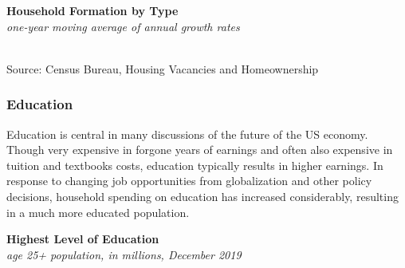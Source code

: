 \documentclass{report}
\makeatletter
\newcommand{\tbllink}[1]{\href{https://raw.githubusercontent.com/bdecon/US-chartbook/master/chartbook/data/#1}{\faTable}}
\newcommand*\short[1]{\expandafter\@gobbletwo\number\numexpr#1\relax}
\newcommand{\sbar}[4]{
		\addplot[ybar stacked, bar width=2.7pt, draw opacity=0, fill=#1] 
			table [x=#2, y=#3, col sep=comma]{#4};}
\newcommand{\stdnode}[3]{\node[below, align=left, shift=({#1,#2})]{#3};}
\newcommand{\dateaxisticks}{
		date coordinates in=x, axis line style={draw=none},
		xmax={2020-02-01},
		max space between ticks=40,	    
		xtick={{1990-01-01}, {1992-01-01}, {1994-01-01}, 
			{1996-01-01}, {1998-01-01}, {2000-01-01}, 
			{2002-01-01}, {2004-01-01}, {2006-01-01},
			{2008-01-01}, {2010-01-01}, {2012-01-01}, {2014-01-01},
		    {2016-01-01}, {2018-01-01}, {2020-01-01}},
		minor xtick={{1989-01-01}, {1991-01-01}, {1993-01-01},
			{1995-01-01}, {1997-01-01}, {1999-01-01}, 
			{2001-01-01}, {2003-01-01}, {2005-01-01}, {2007-01-01},
		    {2009-01-01}, {2011-01-01}, {2013-01-01}, {2015-01-01},
		    {2017-01-01}, {2019-01-01}},
		enlarge y limits={0.06}, enlarge x limits={0.01},
		}
\newcommand{\bbar}[2]{extra #1 ticks = {{#2}}, extra #1 tick labels = ,
		extra #1 tick style = {grid=major, grid style={thick, black!25}},}
\newcommand{\stdline}[4]{\addplot[very thick, no markers, color=#1] 
		table [x=#2, y=#3, col sep=comma] {#4};	}
\newcommand{\rbars}{
		\fill[color=black!10] (axis cs:{1990-07-01},\pgfkeysvalueof{/pgfplots/ymin}) rectangle 
			(axis cs:{1991-03-01}, \pgfkeysvalueof{/pgfplots/ymax});
		\fill[color=black!10] (axis cs:{2007-12-01},\pgfkeysvalueof{/pgfplots/ymin}) rectangle 
			(axis cs:{2009-07-01}, \pgfkeysvalueof{/pgfplots/ymax});
		\fill[color=black!10] (axis cs:{2001-03-01},\pgfkeysvalueof{/pgfplots/ymin}) rectangle 
			(axis cs:{2001-11-01}, \pgfkeysvalueof{/pgfplots/ymax});}
\makeatother
\begin{document}
{{\begin{minipage}{0.76\textwidth}
\vspace{2mm}

\noindent \normalsize \textbf{Household Formation by Type}\\
\footnotesize{\textit{one-year moving average of annual growth rates}}\\
\noindent \hspace*{-2mm} \\
\footnotesize{Source: Census Bureau, Housing Vacancies and Homeownership}  \hfill \tbllink{hhform.csv}


\end{minipage}

\newpage

\begin{minipage}{0.76\textwidth}

\subsubsection*{\color{black!70} \seriffont Education}

\small Education is central in many discussions of the future of the US economy. Though very expensive in forgone years of earnings and often also expensive in tuition and textbooks costs, education typically results in higher earnings. In response to changing job opportunities from globalization and other policy decisions, household spending on education has increased considerably, resulting in a much more educated population.

\end{minipage}

\vspace{2mm}

\begin{minipage}{0.33\textwidth}
\small  
\end{minipage}\hspace{5mm}
\begin{minipage}{0.4\textwidth}
\noindent \normalsize \textbf{Highest Level of Education}\\
\footnotesize{\textit{age 25+ population, in millions, December 2019}}\\


\end{minipage}}}
\end{document}
